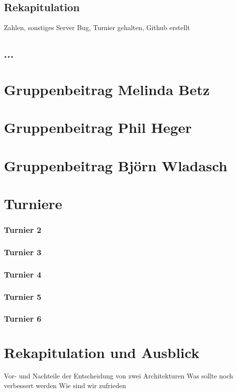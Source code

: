 \documentclass[runningheads]{llncs}
\begin{document}
\subsection{Rekapitulation}
Zahlen, sonstiges Server Bug, Turnier gehalten, Github erstellt

\subsection{...}

\section{Gruppenbeitrag Melinda Betz}

\section{Gruppenbeitrag Phil Heger}

\section{Gruppenbeitrag Björn Wladasch}

\section{Turniere}
\subsubsection{Turnier 2}
\subsubsection{Turnier 3}
\subsubsection{Turnier 4}
\subsubsection{Turnier 5}
\subsubsection{Turnier 6}

\section{Rekapitulation und Ausblick}
Vor- und Nachteile der Entscheidung von zwei Architekturen
Was sollte noch verbessert werden
Wie sind wir zufrieden
\end{document}
